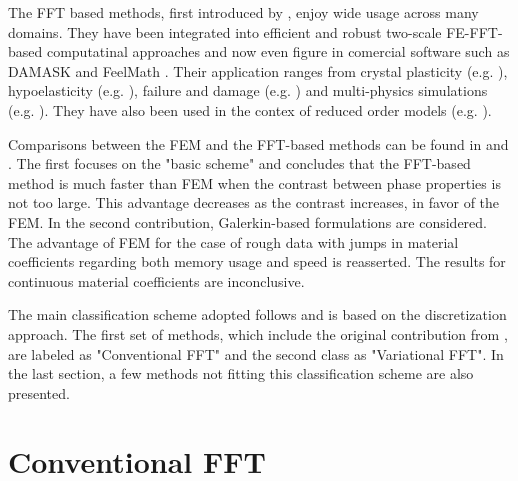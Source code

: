 The FFT based methods, first introduced by \cite{moulinec_fast_1994, moulinec_fft-based_1995}, enjoy wide usage across many domains.
They have been integrated into efficient and robust two-scale FE-FFT-based computatinal approaches \citep{kochmann_efficient_2018-1} and now even figure in comercial software such as DAMASK \citep{roters_damaskdusseldorf_2019} and FeelMath \citep{schwichow_geodict_2020, fraunhofer_itwm_feelmath_2020}.
Their application ranges from crystal plasticity (e.g. \cite{lebensohn_n-site_2001, shanthraj_numerically_2015, kochmann_efficient_2018, lebensohn_spectral_2020, wicht_efficient_2020}), hypoelasticity (e.g. \cite{ma_fft-based_2019}), failure and damage (e.g. \cite{ernesti_fast_2020, ernesti_fft-based_2021, geus_damage_2016, magri_fft_2021, wang_progressive_2018}) and multi-physics simulations (e.g. \cite{vinogradov_accelerated_2008,brenner_computational_2010,shanthraj_spectral_2019, gokuzum_multiscale_2019, zhou_accelerated_2020,wicht_computing_2020}).
They have also been used in the contex of reduced order models (e.g. \cite{kochmann_simple_2019, gierden_geometrically_2021}).

Comparisons between the FEM and the FFT-based methods can be found in \cite{michel_effective_1999} and \cite{vondrejc_energy-based_2020}.
The first focuses on the "basic scheme" and concludes that the FFT-based method is much faster than FEM when the contrast between phase properties is not too large.
This advantage decreases as the contrast increases, in favor of the FEM.
In the second contribution, Galerkin-based formulations are considered.
The advantage of FEM for the case of rough data with jumps in material coefficients regarding both memory usage and speed is reasserted.
The results for continuous material coefficients are inconclusive.


The main classification scheme adopted follows \cite{zeman_finite_2017} and is based on the discretization approach.
The first set of methods, which include the original contribution from \cite{moulinec_fast_1994}, are labeled as "Conventional FFT" and the second class as "Variational FFT".
In the last section, a few methods not fitting this classification scheme are also presented.


\section{Conventional FFT}

